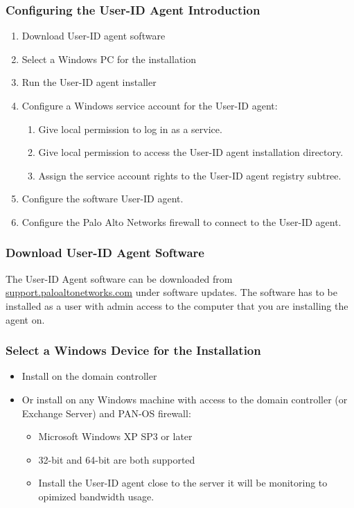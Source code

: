 \subsubsection{Configuring the User-ID Agent Introduction}
\begin{enumerate}
    \item Download User-ID agent software
    \item Select a Windows PC for the installation
    \item Run the User-ID agent installer
    \item Configure a Windows service account for the User-ID agent:
        \begin{enumerate}
            \item Give local permission to log in as a service.
            \item Give local permission to access the User-ID agent installation directory.
            \item Assign the service account rights to the User-ID agent registry subtree.
        \end{enumerate}
    \item Configure the software User-ID agent.
    \item Configure the Palo Alto Networks firewall to connect to the User-ID agent.
\end{enumerate}

\subsubsection{Download User-ID Agent Software}
The User-ID Agent software can be downloaded from \href{support.paloaltonetworks.com}{support.paloaltonetworks.com}
under software updates. 
The software has to be installed as a user with admin access to the computer that you are installing the agent on.

\subsubsection{Select a Windows Device for the Installation}
\begin{itemize}
    \item Install on the domain controller
    \item Or install on any Windows machine with access to the domain controller (or Exchange Server) and PAN-OS firewall:
        \begin{itemize}
            \item Microsoft Windows XP SP3 or later
            \item 32-bit and 64-bit are both supported
            \item Install the User-ID agent close to the server it will be monitoring to opimized bandwidth usage.
        \end{itemize}
\end{itemize}

